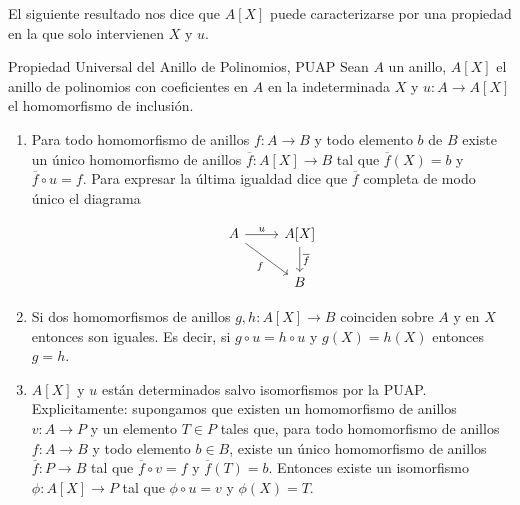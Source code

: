 El siguiente resultado nos dice que \(A[X]\) puede caracterizarse por una propiedad en la que solo intervienen \(X\) y \(u\).

\begin{proposition}{Propiedad Universal del Anillo de Polinomios, PUAP}{}
Sean \(A\) un anillo, \(A[X]\) el anillo de polinomios con coeficientes en \(A\) en la indeterminada \(X\) y \(u : A \to A[X]\) el homomorfismo de inclusión.

\begin{enumerate}
    \item Para todo homomorfismo de anillos \(f : A \to B\) y todo elemento \(b\) de \(B\) existe un único homomorfismo de anillos \(\overline{f} : A[X] \to B\) tal que \(\overline{f}(X) = b\) y \(\overline{f} \circ u = f\). Para expresar la última igualdad dice que \(\overline{f}\) completa de modo único el diagrama
    
    \[
    \begin{tikzcd}
    A \arrow[r, "u"] \arrow[dr, "f"'] & A[X] \arrow[d, "\overline{f}"] \\
    & B
    \end{tikzcd}
    \]
    
    \item Si dos homomorfismos de anillos \(g, h : A[X] \to B\) coinciden sobre \(A\) y en \(X\) entonces son iguales. Es decir, si \(g \circ u = h \circ u\) y \(g(X) = h(X)\) entonces \(g = h\).
    \item \(A[X]\) y \(u\) están determinados salvo isomorfismos por la PUAP. Explicitamente: supongamos que existen un homomorfismo de anillos \(v:A\to P\) y un elemento \(T\in P\) tales que, para todo homomorfismo de anillos \(f:A\to B\) y todo elemento \(b\in B\), existe un único homomorfismo de anillos \(\overline{f}:P\to B\) tal que \(\overline{f}\circ v=f\) y \(\overline{f}(T)=b\). Entonces existe un isomorfismo \(\phi:A[X]\to P\) tal que \(\phi\circ u=v\) y \(\phi(X)=T\).
\end{enumerate}
\end{proposition}

